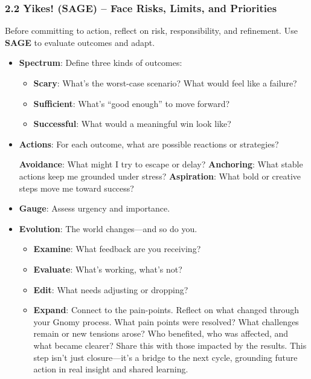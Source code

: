 \documentclass{article}
\begin{document}
\subsubsection{2.2 Yikes! (SAGE) – Face Risks, Limits, and Priorities}
Before committing to action, reflect on risk, responsibility, and refinement. Use \textbf{SAGE} to evaluate outcomes and adapt.
\begin{itemize}[noitemsep,topsep=0pt]
    \item \textbf{Spectrum}: Define three kinds of outcomes:
    \begin{itemize}[noitemsep,topsep=0pt]
        \item \textbf{Scary}: What's the worst-case scenario? What would feel like a failure?
        \item \textbf{Sufficient}: What's ``good enough'' to move forward?
        \item \textbf{Successful}: What would a meaningful win look like?
    \end{itemize}
    \item \textbf{Actions}: For each outcome, what are possible reactions or strategies?
    \begin{itemize}[noitemsep,topsep=0pt]
        \textbf{Avoidance}: What might I try to escape or delay?
        \textbf{Anchoring}: What stable actions keep me grounded under stress?
        \textbf{Aspiration}: What bold or creative steps move me toward success?
    \end{itemize}
    \item \textbf{Gauge}: Assess urgency and importance.
    \item \textbf{Evolution}: The world changes—and so do you.
    \begin{itemize}[noitemsep,topsep=0pt]
        \item \textbf{Examine}: What feedback are you receiving?
        \item \textbf{Evaluate}: What's working, what's not?
        \item \textbf{Edit}: What needs adjusting or dropping?
        \item \textbf{Expand}: Connect to the pain-points. Reflect on what changed through your Gnomy process. What pain points were resolved? What challenges remain or new tensions arose? Who benefited, who was affected, and what became clearer? Share this with those impacted by the results. This step isn't just closure—it's a bridge to the next cycle, grounding future action in real insight and shared learning.
    \end{itemize}
\end{itemize}
\end{document}
